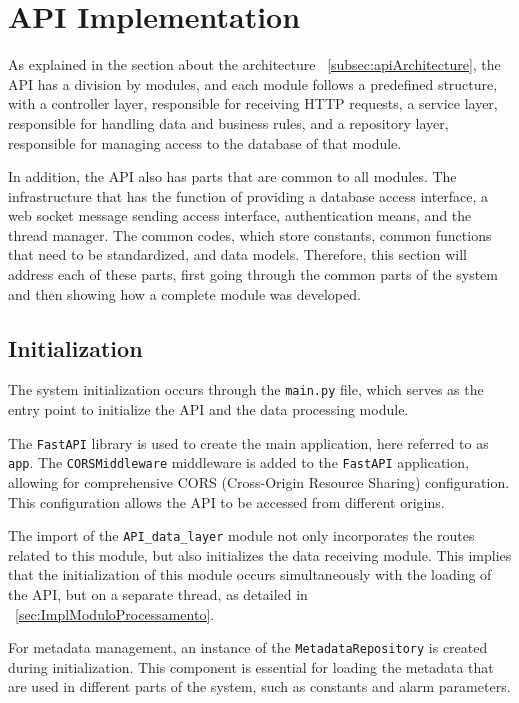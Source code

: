 
\section[API Implementation]{API Implementation}\label{sec:api}
As explained in the section about the architecture ~\ref{subsec:apiArchitecture}, the \gls{API} has a division by modules, and each module follows a predefined structure, with a controller layer, responsible for receiving \gls{HTTP} requests, a service layer, responsible for handling data and business rules, and a repository layer, responsible for managing access to the database of that module.

In addition, the \gls{API} also has parts that are common to all modules. The infrastructure that has the function of providing a database access interface, a web socket message sending access interface, authentication means, and the thread manager. The common codes, which store constants, common functions that need to be standardized, and data models.
Therefore, this section will address each of these parts, first going through the common parts of the system and then showing how a complete module was developed.

\subsection{Initialization}\label{subsec:main}
The system initialization occurs through the \texttt{main.py} file, which serves as the entry point to initialize the \gls{API} and the data processing module.

The \texttt{FastAPI} library \cite{fastapiDocs} is used to create the main application, here referred to as \texttt{app}. The \texttt{CORSMiddleware} middleware is added to the \texttt{FastAPI} application, allowing for comprehensive \gls{CORS} (Cross-Origin Resource Sharing) configuration. This configuration allows the \gls{API} to be accessed from different origins.

The import of the \texttt{API\_data\_layer} module not only incorporates the routes related to this module, but also initializes the data receiving module. This implies that the initialization of this module occurs simultaneously with the loading of the \gls{API}, but on a separate thread, as detailed in ~\ref{sec:ImplModuloProcessamento}.

For metadata management, an instance of the \texttt{MetadataRepository} is created during initialization. This component is essential for loading the metadata that are used in different parts of the system, such as constants and alarm parameters.

